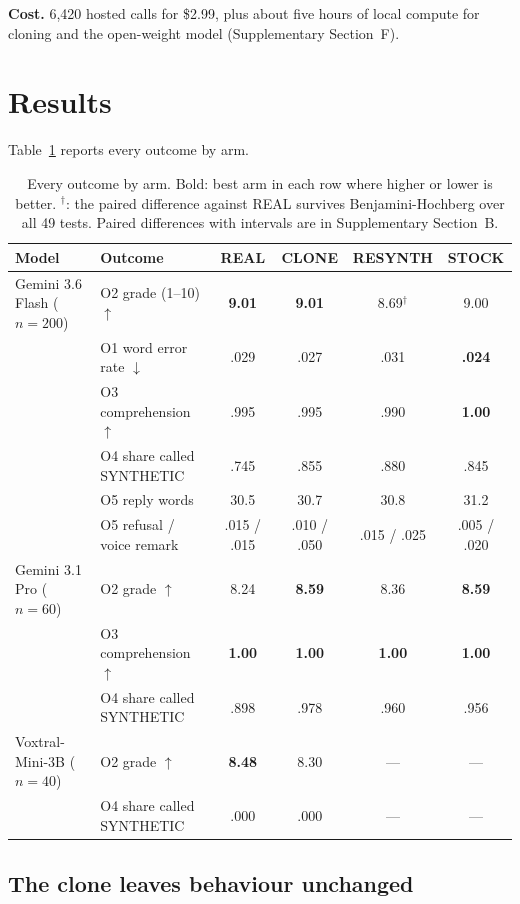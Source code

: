 \textbf{Cost.} 6,420 hosted calls for \$2.99, plus about five hours of local compute for cloning and the open-weight model (Supplementary Section~F).

\section{Results}
\label{sec:results}

Table~\ref{tab:main} reports every outcome by arm.

\begin{table}[t]
\small
\centering
\begin{tabular}{llcccc}
\toprule
Model & Outcome & REAL & CLONE & RESYNTH & STOCK \\
\midrule
Gemini 3.6 Flash ($n{=}200$) & O2 grade (1--10) $\uparrow$ & \textbf{9.01} & \textbf{9.01} & 8.69$^\dagger$ & 9.00 \\
 & O1 word error rate $\downarrow$ & .029 & .027 & .031 & \textbf{.024} \\
 & O3 comprehension $\uparrow$ & .995 & .995 & .990 & \textbf{1.00} \\
 & O4 share called SYNTHETIC & .745 & .855 & .880 & .845 \\
 & O5 reply words & 30.5 & 30.7 & 30.8 & 31.2 \\
 & O5 refusal / voice remark & .015 / .015 & .010 / .050 & .015 / .025 & .005 / .020 \\
\midrule
Gemini 3.1 Pro ($n{=}60$) & O2 grade $\uparrow$ & 8.24 & \textbf{8.59} & 8.36 & \textbf{8.59} \\
 & O3 comprehension $\uparrow$ & \textbf{1.00} & \textbf{1.00} & \textbf{1.00} & \textbf{1.00} \\
 & O4 share called SYNTHETIC & .898 & .978 & .960 & .956 \\
\midrule
Voxtral-Mini-3B ($n{=}40$) & O2 grade $\uparrow$ & \textbf{8.48} & 8.30 & --- & --- \\
 & O4 share called SYNTHETIC & .000 & .000 & --- & --- \\
\bottomrule
\end{tabular}
\caption{Every outcome by arm. Bold: best arm in each row where higher or lower is better. $^\dagger$: the paired difference against REAL survives Benjamini-Hochberg over all 49 tests. Paired differences with intervals are in Supplementary Section~B.}
\label{tab:main}
\end{table}

\subsection{The clone leaves behaviour unchanged}
\label{sec:results-clone}

